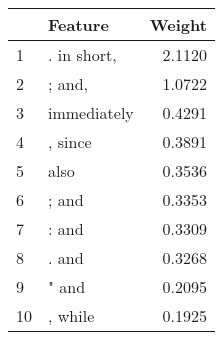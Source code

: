 \begin{tabular}{llr}
\toprule
{} &      Feature &  Weight \\
\midrule
1  &  . in short, &  2.1120 \\
2  &       ; and, &  1.0722 \\
3  &  immediately &  0.4291 \\
4  &      , since &  0.3891 \\
5  &         also &  0.3536 \\
6  &        ; and &  0.3353 \\
7  &        : and &  0.3309 \\
8  &        . and &  0.3268 \\
9  &        " and &  0.2095 \\
10 &      , while &  0.1925 \\
\bottomrule
\end{tabular}
